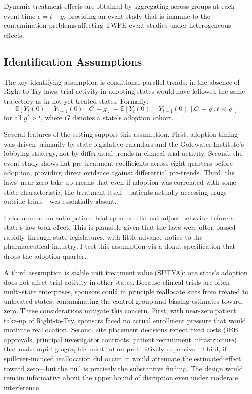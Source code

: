 \documentclass[12pt]{article}
\newcommand{\E}{\mathbb{E}}
\begin{document}
Dynamic treatment effects are obtained by aggregating across groups at each event time $e = t - g$, providing an event study that is immune to the contamination problems affecting TWFE event studies under heterogeneous effects.

\subsection{Identification Assumptions}

The key identifying assumption is conditional parallel trends: in the absence of Right-to-Try laws, trial activity in adopting states would have followed the same trajectory as in not-yet-treated states. Formally:
\begin{equation}
    \E[Y_t(0) - Y_{t-1}(0) \mid G = g] = \E[Y_t(0) - Y_{t-1}(0) \mid G = g', t < g']
    \label{eq:pt}
\end{equation}
for all $g' > t$, where $G$ denotes a state's adoption cohort.

Several features of the setting support this assumption. First, adoption timing was driven primarily by state legislative calendars and the Goldwater Institute's lobbying strategy, not by differential trends in clinical trial activity. Second, the event study shows flat pre-treatment coefficients across eight quarters before adoption, providing direct evidence against differential pre-trends. Third, the laws' near-zero take-up means that even if adoption was correlated with some state characteristic, the treatment itself---patients actually accessing drugs outside trials---was essentially absent.

I also assume no anticipation: trial sponsors did not adjust behavior before a state's law took effect. This is plausible given that the laws were often passed rapidly through state legislatures, with little advance notice to the pharmaceutical industry. I test this assumption via a donut specification that drops the adoption quarter.

A third assumption is stable unit treatment value (SUTVA): one state's adoption does not affect trial activity in other states. Because clinical trials are often multi-state enterprises, sponsors could in principle reallocate sites from treated to untreated states, contaminating the control group and biasing estimates toward zero. Three considerations mitigate this concern. First, with near-zero patient take-up of Right-to-Try, sponsors faced no actual enrollment pressure that would motivate reallocation. Second, site placement decisions reflect fixed costs (IRB approvals, principal investigator contracts, patient recruitment infrastructure) that make rapid geographic substitution prohibitively expensive \citep{dimasi2016innovation}. Third, if spillover-induced reallocation did occur, it would attenuate the estimated effect toward zero---but the null is precisely the substantive finding. The design would remain informative about the upper bound of disruption even under moderate interference.
\end{document}
